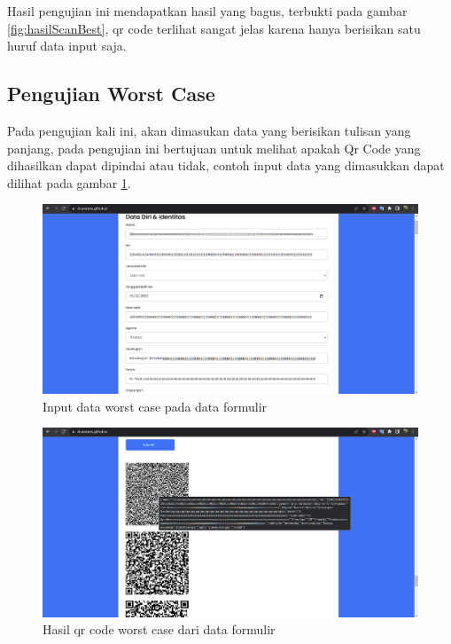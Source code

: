Hasil pengujian ini mendapatkan hasil yang bagus, terbukti pada gambar \ref{fig:hasilScanBest}, qr code terlihat sangat jelas karena hanya berisikan satu huruf data input saja.

\subsection{Pengujian Worst Case}
\label{sec:pengujianWorst}

Pada pengujian kali ini, akan dimasukan data yang berisikan tulisan yang panjang, pada pengujian ini bertujuan untuk melihat apakah Qr Code yang dihasilkan dapat dipindai atau tidak, contoh input data yang dimasukkan dapat dilihat pada gambar \ref{fig:inputWorstCase}.

\begin{figure}[H]
	\centering
	\includegraphics[scale=0.4]{Gambar/inputWorstCase.png}
	\caption{Input data worst case pada data formulir} 
	\label{fig:inputWorstCase}
\end{figure}

\begin{figure}[H]
	\centering
	\includegraphics[scale=0.4]{Gambar/qrCodeWorstCase.png}
	\caption{Hasil qr code worst case dari data formulir} 
	\label{fig:qrCodeWorstCase}
\end{figure}

